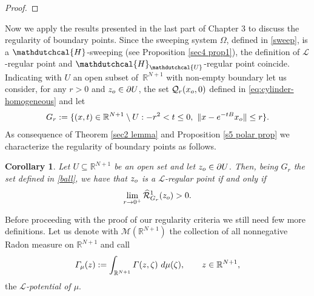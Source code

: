 \documentclass{amsart}
\newtheorem{corol}[thm]{Corollary}
\numberwithin{equation}{section}
\def \Lc{{\mathcal{L}}}
\def \r{{\mathbb{R}}}
\def \Hd{{\mathdutchcal{H}}}
\def \Ud{{\mathdutchcal{U}}}
\def \balayage{{\widehat{\mathcal{R}}}}
\renewcommand{\Gamma}{\varGamma}
\begin{document}
{\begin{proof}
\end{proof}
Now we apply the results presented in the last part of Chapter 3 to discuss the regularity of boundary points. Since the sweeping system $\Omega$, defined in \eqref{sweep}, is a $\Hd$-sweeping (see Proposition \textup{\ref{sec4 prop1}}), the definition of $\Lc$-regular point and $\Hd_{\Ud}$-regular point coincide. Indicating with $U$ an open subset of~$\r^{N+1}$ with non-empty boundary
 let us consider, for any $r>0$ and $z_{\rm o} \in \partial U$, the set $\mathcal{Q}_r(x_{\rm o},0)$ defined in \eqref{eq:cylinder-homogeneous}
 and  let
 \begin{equation}\label{ball}
     G_r:=  \{ (x,t) \in \r^{N+1}\setminus U: -r^2 < t \leq 0, \ \| x-e^{-tB}x_{\rm o}\| \leq r\}.
 \end{equation}
As consequence of Theorem \ref{sec2 lemma} and Proposition \ref{s5 polar prop} we characterize the regularity of boundary points as follows.

\begin{corol}\label{reg condition}
	Let $U \subseteq \r^{N+1}$ be an open set and let $z_{\rm o} \in \partial U$. Then, being $G_r$ the set defined in \eqref{ball}, we have that $z_{\rm o}$ is a $\Lc$-regular point if and only if
	\begin{equation*}%
		\lim_{r \rightarrow 0^+}\balayage^1_{	G_r}(z_{\rm o})>0.
	\end{equation*}
\end{corol}

Before proceeding with the proof of our regularity criteria we still need few more definitions. Let us denote with $\mathcal{M}(\r^{N+1})$ the collection of all nonnegative Radon measure on $\r^{N+1}$ and call 
\[
\Gamma_\mu(z) :=\int_{\r^{N+1}} \Gamma(z,\zeta)\ {\rm d}\mu(\zeta),\qquad z\in \r^{N+1},
\]
the {\it $\Lc$-potential of $\mu$}. 


}
\end{document}
